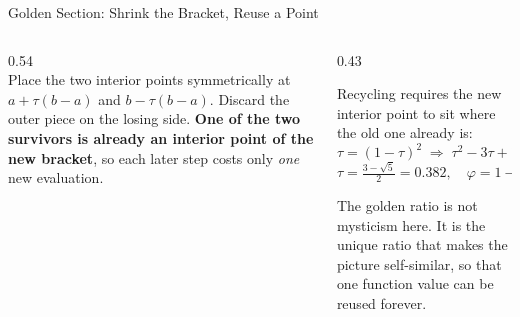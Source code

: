 \begin{frame}{Golden Section: Shrink the Bracket, Reuse a Point}
\begin{columns}[T]
\begin{column}{0.54\textwidth}
\centering
{}
\\[3mm]
\small
Place the two interior points symmetrically at $a+\tau(b-a)$ and $b-\tau(b-a)$. Discard the outer piece on the losing side. \textbf{One of the two survivors is already an interior point of the new bracket}, so each later step costs only \emph{one} new evaluation.
\end{column}
\begin{column}{0.43\textwidth}
\begin{conceptbox}[title=\textbf{Why that ratio}]\small
Recycling requires the new interior point to sit where the old one already is:
\[
  \tau=(1-\tau)^{2}\;\Longrightarrow\;\tau^{2}-3\tau+1=0,
\]
\[
  \tau=\tfrac{3-\sqrt5}{2}=0.382,\quad \varphi=1-\tau=0.618 .
\]
\end{conceptbox}
\medskip
\begin{examplebox}\footnotesize
The golden ratio is not mysticism here. It is the unique ratio that makes the picture self-similar, so that one function value can be reused forever.
\end{examplebox}
\end{column}
\end{columns}
\vspace{1mm}
\end{frame}

